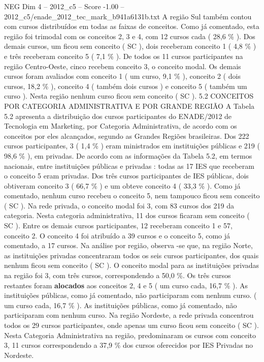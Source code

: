 \begin{textsample}{NEG Dim 4 – 2012\_c5 – Score -1.00 – 2012\_c5/enade\_2012\_tec\_mark\_b941a6131b.txt}
A região Sul também contou com cursos distribuídos em todas as faixas de conceitos.
Como já comentado, esta região foi trimodal com os conceitos 2, 3 e 4, com 12 cursos cada ( 28,6 \% ).
Dos demais cursos, um ficou sem conceito ( SC ), dois receberam conceito 1 ( 4,8 \% ) e três receberam conceito 5 ( 7,1 \% ).
De todos os 11 cursos participantes na região Centro-Oeste, cinco recebem conceito 3, o conceito modal.
Os demais cursos foram avaliados com conceito 1 ( um curso, 9,1 \% ), conceito 2 ( dois cursos, 18,2 \% ), conceito 4 ( também dois cursos ) e conceito 5 ( também um curso ).
Nesta região nenhum curso ficou sem conceito ( SC ). 5.2 CONCEITOS POR CATEGORIA ADMINISTRATIVA E POR GRANDE REGIÃO A Tabela 5.2 apresenta a distribuição dos cursos participantes do ENADE/2012 de Tecnologia em Marketing, por Categoria Administrativa, de acordo com os conceitos por eles alcançados, segundo as Grandes Regiões brasileiras.
Dos 222 cursos participantes, 3 ( 1,4 \% ) eram ministrados em instituições públicas e 219 ( 98,6 \% ), em privadas.
De acordo com as informações da Tabela 5.2, em termos nacionais, entre instituições públicas e privadas : todas as 17 IES que receberam o conceito 5 eram privadas.
Dos três cursos participantes de IES públicas, dois obtiveram conceito 3 ( 66,7 \% ) e um obteve conceito 4 ( 33,3 \% ).
Como já comentado, nenhum curso recebeu o conceito 5, nem tampouco ficou sem conceito ( SC ).
Na rede privada, o conceito modal foi 3, com 83 cursos dos 219 da categoria.
Nesta categoria administrativa, 11 dos cursos ficaram sem conceito ( SC ).
Entre os demais cursos participantes, 12 receberam conceito 1 e 57, conceito 2.
O conceito 4 foi atribuído a 39 cursos e o conceito 5, como já comentado, a 17 cursos.
Na análise por região, observa -se que, na região Norte, as instituições privadas concentraram todos os seis cursos participantes, dos quais nenhum ficou sem conceito ( SC ).
O conceito modal para as instituições privadas na região foi 3, com três cursos, correspondendo a 50,0 \%.
Os três cursos restantes foram \textbf{alocados} aos conceitos 2, 4 e 5 ( um curso cada, 16,7 \% ).
As instituições públicas, como já comentado, não participaram com nenhum curso. ( um curso cada, 16,7 \% ).
As instituições públicas, como já comentado, não participaram com nenhum curso.
Na região Nordeste, a rede privada concentrou todos os 29 cursos participantes, onde apenas um curso ficou sem conceito ( SC ).
Nesta Categoria Administrativa na região, predominaram os cursos com conceito 3, 11 cursos correspondendo a 37,9 \% dos cursos oferecidos por IES Privadas no Nordeste.

\end{textsample}
